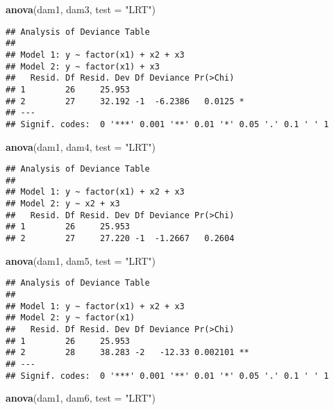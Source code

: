 \documentclass[]{article}
\newenvironment{Shaded}{\begin{snugshade}}{\end{snugshade}}
\newcommand{\KeywordTok}[1]{\textcolor[rgb]{0.13,0.29,0.53}{\textbf{#1}}}
\newcommand{\DataTypeTok}[1]{\textcolor[rgb]{0.13,0.29,0.53}{#1}}
\newcommand{\StringTok}[1]{\textcolor[rgb]{0.31,0.60,0.02}{#1}}
\newcommand{\NormalTok}[1]{#1}
\begin{document}
\begin{Shaded}
\begin{Highlighting}[]
\KeywordTok{anova}\NormalTok{(dam1, dam3, }\DataTypeTok{test =} \StringTok{"LRT"}\NormalTok{)}
\end{Highlighting}
\end{Shaded}

\begin{verbatim}
## Analysis of Deviance Table
## 
## Model 1: y ~ factor(x1) + x2 + x3
## Model 2: y ~ factor(x1) + x3
##   Resid. Df Resid. Dev Df Deviance Pr(>Chi)  
## 1        26     25.953                       
## 2        27     32.192 -1  -6.2386   0.0125 *
## ---
## Signif. codes:  0 '***' 0.001 '**' 0.01 '*' 0.05 '.' 0.1 ' ' 1
\end{verbatim}

\begin{Shaded}
\begin{Highlighting}[]
\KeywordTok{anova}\NormalTok{(dam1, dam4, }\DataTypeTok{test =} \StringTok{"LRT"}\NormalTok{)}
\end{Highlighting}
\end{Shaded}

\begin{verbatim}
## Analysis of Deviance Table
## 
## Model 1: y ~ factor(x1) + x2 + x3
## Model 2: y ~ x2 + x3
##   Resid. Df Resid. Dev Df Deviance Pr(>Chi)
## 1        26     25.953                     
## 2        27     27.220 -1  -1.2667   0.2604
\end{verbatim}

\begin{Shaded}
\begin{Highlighting}[]
\KeywordTok{anova}\NormalTok{(dam1, dam5, }\DataTypeTok{test =} \StringTok{"LRT"}\NormalTok{)}
\end{Highlighting}
\end{Shaded}

\begin{verbatim}
## Analysis of Deviance Table
## 
## Model 1: y ~ factor(x1) + x2 + x3
## Model 2: y ~ factor(x1)
##   Resid. Df Resid. Dev Df Deviance Pr(>Chi)   
## 1        26     25.953                        
## 2        28     38.283 -2   -12.33 0.002101 **
## ---
## Signif. codes:  0 '***' 0.001 '**' 0.01 '*' 0.05 '.' 0.1 ' ' 1
\end{verbatim}

\begin{Shaded}
\begin{Highlighting}[]
\KeywordTok{anova}\NormalTok{(dam1, dam6, }\DataTypeTok{test =} \StringTok{"LRT"}\NormalTok{)}
\end{Highlighting}
\end{Shaded}
\end{document}

